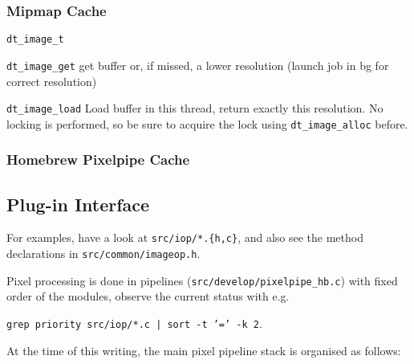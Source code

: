 \documentclass[a4paper,twoside]{scrartcl}
\newcommand{\code}[1]{\texttt{\color{codecol}#1}}
\begin{document}
\subsubsection{Mipmap Cache}

\code{dt\_image\_t}

\begin{description}
  \item{\code{dt\_image\_get}} get buffer or, if missed, a lower resolution (launch job in bg for correct resolution)
  \item{\code{dt\_image\_load}} Load buffer in this thread, return exactly this resolution.
    No locking is performed, so be sure to acquire the lock using \code{dt\_image\_alloc} before.
\end{description}

\subsubsection{Homebrew Pixelpipe Cache}

\newpage
\subsection{Plug-in Interface}

For examples, have a look at \code{src/iop/*.\{h,c\}}, and also see the method declarations in \code{src/common/imageop.h}.

Pixel processing is done in pipelines (\code{src/develop/pixelpipe\_hb.c}) with fixed order of the modules,
observe the current status with e.g.

\code{grep priority src/iop/*.c | sort -t '=' -k 2}.

At the time of this writing, the main pixel pipeline stack is organised as follows:

\medskip
\end{document}
